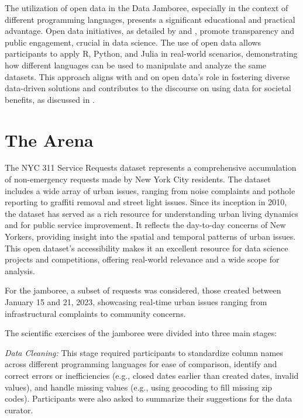 \documentclass[12pt, letterpaper]{article}
\begin{document}
The utilization of open data in the Data Jamboree, especially in the context of
different programming languages, presents a significant educational and
practical advantage. Open data initiatives, as detailed by
\citet{beheshti2019datasynapse} and \citet{janssen2012benefits}, promote
transparency and public engagement, crucial in data science. The use of open
data allows participants to apply R, Python, and Julia in real-world scenarios,
demonstrating how different languages can be used to manipulate and analyze the
same datasets. This approach aligns with \citet{borgman2012conundrum} and
\citet{cantor2018facets} on open data's role in fostering diverse data-driven
solutions and contributes to the discourse on using data for societal benefits,
as discussed in \citet{ridgway2023data}.


\section{The Arena}
\label{sec:arena}

The NYC 311 Service Requests dataset represents a comprehensive accumulation of
non-emergency requests made by New York City residents. The dataset includes a
wide array of urban issues, ranging from noise complaints and pothole reporting
to graffiti removal and street light issues. Since its inception in 2010, the
dataset has served as a rich resource for understanding urban living dynamics
and for public service improvement. It reflects the day-to-day concerns of New
Yorkers, providing insight into the spatial and temporal patterns of urban
issues. This open dataset's accessibility makes it an excellent resource for
data science projects and competitions, offering real-world relevance and a wide
scope for analysis.


For the jamboree, a subset of requests was considered, those created between
January 15 and 21, 2023, showcasing real-time urban issues ranging from
infrastructural complaints to community concerns.


The scientific exercises of the jamboree were divided into three main stages:

\emph{Data Cleaning:} This stage required participants to standardize column
names across different programming languages for ease of comparison, identify
and correct errors or inefficiencies (e.g., closed dates earlier than created
dates, invalid values), and handle missing values (e.g., using geocoding to fill
missing zip codes). Participants were also asked to summarize their suggestions
for the data curator.
\end{document}
